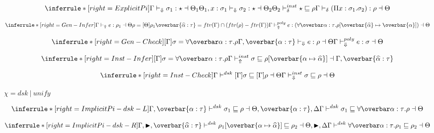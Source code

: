 \[
\inferrule*[right=ExplicitPi]
{\checktype \sigma_1 : \star \dashv \Theta_1 \\
\Theta_1, x:\sigma_1 \checktypeno \sigma_2 : \star \dashv \Theta_2 \\
\Theta_2 \instinfercheck \star \sqsubseteq \rho
}
{\infercheck (\Pi x : \sigma_1. \sigma_2) : \rho \dashv \Theta}
\]


\[
\inferrule*[right=Gen-Infer]
{\infertype e :\rho_1 \dashv \Theta\\
\rho = [\Theta]\rho_1 \\
\overbar{\widehat \alpha:\tau}=ftv(\Gamma) \cap (ftv(\rho)-ftv(\Gamma))
}
{\polyinfer e :(\forallvars{\alpha:\tau}. \rho[\overbar{\widehat \alpha} \mapsto \overbar{\alpha}]) \dashv \Theta}
\]

\[
\inferrule*[right=Gen-Check]
{
[\Gamma]\sigma = \forallvars{\alpha:\tau}. \rho \\
\Gamma, \overbar{\alpha:\tau} \checktypeno e :\rho \dashv \Theta
}
{\polycheck e : \sigma \dashv \Theta}
\]

\framebox{$ \Gamma \instinfercheck \sigma \sqsubseteq \rho \dashv \Theta$ }

\[
\inferrule*[right=Inst-Infer]
{[\Gamma] \sigma = \forallvars{\alpha:\tau}. \rho
}
{\Gamma \instinfer \sigma \sqsubseteq \rho[\overbar{\tpmapsto {\tau} \alpha {\widehat{\alpha}}}] \dashv \Gamma, \overbar{\widehat{\alpha}:\tau}}
\]

\[
\inferrule*[right=Inst-Check]
{\Gamma \polymorphic [\Gamma]\sigma \sqsubseteq [\Gamma]\rho \dashv \Theta} { \Gamma \instcheck \sigma \sqsubseteq \rho \dashv \Theta}
\]

\newcommand{\dskunify}[0]{\vdash^{\chi}}
\framebox{$ \Gamma \dskunify \sigma_1 \sqsubseteq \sigma_2 \dashv \Theta$} $\chi = dsk~|~unify$

\[
\inferrule*[right=ImplicitPi-dsk-L]
{
\Gamma, \overbar{\alpha:\tau} \polymorphicstar \sigma_1 \sqsubseteq \rho \dashv \Theta, \overbar{\alpha:\tau}, \Delta}
{\Gamma \polymorphic \sigma_1 \sqsubseteq \forallvars{\alpha:\tau}. \rho \dashv \Theta}
\]

\[
\inferrule*[right=ImplicitPi-dsk-R]
{\Gamma , \blacktriangleright, \overbar{\widehat \alpha : \tau} \polymorphicstar \rho_1[\overbar{\tpmapsto \tau \alpha {\widehat \alpha}}] \sqsubseteq \rho_2 \dashv \Theta, \blacktriangleright, \Delta}
{\Gamma \polymorphicstar \forallvars{\alpha:\tau}.\rho_1 \sqsubseteq \rho_2 \dashv \Theta}
\]

